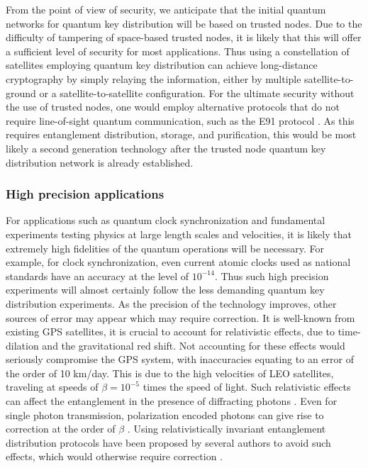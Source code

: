 \documentclass[aps,rmp,reprint,amsmath,amssymb,graphicx,longbibliography]{revtex4-1}
\begin{document}
From the point of view of security, we anticipate that the initial quantum networks for quantum key distribution will be based on trusted nodes.  Due to the difficulty of tampering of space-based trusted nodes, it is likely that this will offer a sufficient level of security for most applications. Thus using a constellation of satellites employing quantum key distribution can achieve long-distance cryptography by simply relaying the information, either by multiple satellite-to-ground or a satellite-to-satellite configuration.  For the ultimate security without the use of trusted nodes, one would employ alternative protocols that do not require line-of-sight quantum communication, such as the E91 protocol \cite{ekert1991quantum}.  As this requires entanglement distribution, storage, and purification, this would be most likely a second generation technology after the trusted node quantum key distribution network is already established.   








\subsubsection{High precision applications}

For applications such as quantum clock synchronization and fundamental experiments testing physics at large length scales and velocities, it is likely that extremely high fidelities of the quantum operations will be necessary.  For example, for clock synchronization, even current atomic clocks used as national standards have an accuracy at the level of $ 10^{-14} $.  Thus such high precision experiments will almost certainly follow the less demanding quantum key distribution experiments.  As the precision of the technology improves, other sources of error may appear which may require correction.  It is well-known from existing GPS satellites, it is crucial to account for relativistic effects, due to time-dilation and the gravitational red shift. Not accounting for these effects would seriously compromise the GPS system, with inaccuracies equating to an error of the order of 10 km/day. This is due to the high velocities of LEO satellites, traveling at speeds of  $ \beta = 10^{-5} $ times the speed of light. Such relativistic effects can affect the entanglement in the presence of diffracting photons \cite{gingrich03}.  Even for single photon transmission, polarization encoded photons can give rise to correction at the order of $ \beta $ \cite{byrnes2017lorentz}.  Using relativistically invariant entanglement distribution protocols have been proposed by several authors to avoid such effects, which would otherwise require correction \cite{yurtsever02,li2003relativistic,byrnes2017lorentz}.  
\end{document}
